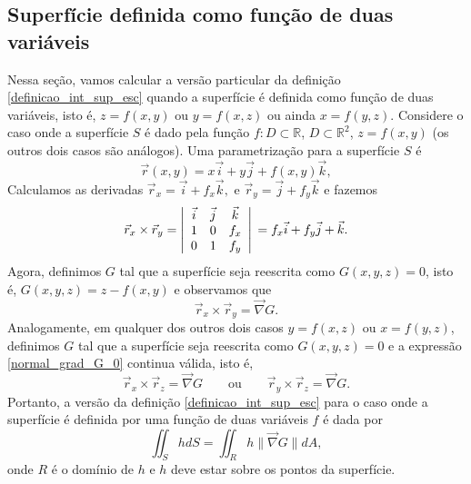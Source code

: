 \subsection{Superfície definida como função de duas variáveis}
Nessa seção, vamos calcular a versão particular da definição \eqref{definicao_int_sup_esc} quando a superfície é definida como função de duas variáveis, isto é, $z=f(x,y)$ ou $y=f(x,z)$ ou ainda $x=f(y,z)$. Considere o caso onde a superfície $S$ é dado pela função $f:D\subset\mathbb{R}$, $D\subset \mathbb{R}^2$, $z=f(x,y)$ (os outros dois casos são análogos). Uma parametrização para a superfície $S$ é
$$
\vec{r}(x,y)= x\vec{i}+ y\vec{j}+ f(x,y)\vec{k},
$$
Calculamos as derivadas $\vec{r}_x=\vec{i}+ f_x\vec{k},$ e $\vec{r}_y=\vec{j}+ f_y\vec{k}$ e fazemos
$$
  \vec{r}_x\times\vec{r}_y=\left|
 \begin{array}{ccc}
 \vec{i} & \vec{j} & \vec{k} \\
  1 &0 & f_x \\
0 &  1 & f_y
 \end{array}
\right|\\= f_x\vec{i}+ f_y\vec{j}+\vec{k}.
$$
Agora, definimos $G$ tal que a superfície seja reescrita como $G(x,y,z)=0$, isto é, $G(x,y,z)=z-f(x,y)$ e observamos que
\begin{equation}\label{normal_grad_G_0}
   \vec{r}_x\times\vec{r}_y=\vec{ \nabla} G.
\end{equation}
Analogamente, em qualquer dos outros dois casos $y=f(x,z)$ ou $x=f(y,z)$, definimos $G$ tal que a superfície seja reescrita como $G(x,y,z)=0$ e a expressão \eqref{normal_grad_G_0} continua válida, isto é,
\begin{equation*}\label{normal_grad_G_0_2}
   \vec{r}_x\times\vec{r}_z=\vec{ \nabla} G\qquad \text{ou} \qquad    \vec{r}_y\times\vec{r}_z=\vec{ \nabla} G.
\end{equation*}
Portanto, a versão da definição \eqref{definicao_int_sup_esc} para o caso onde a superfície é definida por uma função de duas variáveis $f$ é dada por
\begin{equation}\label{definicao_int_sup_esc_par}
\iint_S h d S=  \iint_R h\| \vec{\nabla}G\| dA,
\end{equation}
onde $R$ é o domínio de $h$ e $h$ deve estar sobre os pontos da superfície.


